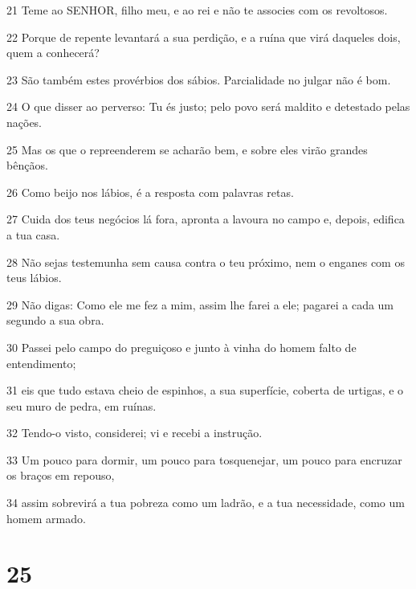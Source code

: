 \par 21 Teme ao SENHOR, filho meu, e ao rei e não te associes com os revoltosos.
\par 22 Porque de repente levantará a sua perdição, e a ruína que virá daqueles dois, quem a conhecerá?
\par 23 São também estes provérbios dos sábios. Parcialidade no julgar não é bom.
\par 24 O que disser ao perverso: Tu és justo; pelo povo será maldito e detestado pelas nações.
\par 25 Mas os que o repreenderem se acharão bem, e sobre eles virão grandes bênçãos.
\par 26 Como beijo nos lábios, é a resposta com palavras retas.
\par 27 Cuida dos teus negócios lá fora, apronta a lavoura no campo e, depois, edifica a tua casa.
\par 28 Não sejas testemunha sem causa contra o teu próximo, nem o enganes com os teus lábios.
\par 29 Não digas: Como ele me fez a mim, assim lhe farei a ele; pagarei a cada um segundo a sua obra.
\par 30 Passei pelo campo do preguiçoso e junto à vinha do homem falto de entendimento;
\par 31 eis que tudo estava cheio de espinhos, a sua superfície, coberta de urtigas, e o seu muro de pedra, em ruínas.
\par 32 Tendo-o visto, considerei; vi e recebi a instrução.
\par 33 Um pouco para dormir, um pouco para tosquenejar, um pouco para encruzar os braços em repouso,
\par 34 assim sobrevirá a tua pobreza como um ladrão, e a tua necessidade, como um homem armado.

\chapter{25}

